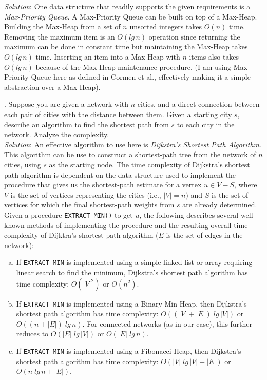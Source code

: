 \documentclass{scrartcl}
\begin{document}
    \noindent
    \textit{Solution}: One data structure that readily supports the given requirements is a
    \emph{Max-Priority Queue}. A Max-Priority Queue can be built on top of a Max-Heap. Building the
    Max-Heap from a set of $n$ unsorted integers takes $O(n)$ time. Removing the maximum item is an
    $O(lg\,n)$ operation since returning the maximum can be done in constant time but maintaining
    the Max-Heap takes $O(lg\,n)$ time. Inserting an item into a Max-Heap with $n$ items also takes
    $O(lg\,n)$ because of the Max-Heap maintenance procedure. (I am using Max-Priority Queue here as
    defined in Cormen et al., effectively making it a simple abstraction over a Max-Heap).

    \newpage
    . Suppose you are given a network with $n$ cities, and a direct connection between each pair of
    cities with the distance between them. Given a starting city $s$, describe an algorithm to find
    the shortest path from $s$ to each city in the network. Analyze the complexity.\\

    \noindent
    \textit{Solution}: An effective algorithm to use here is \emph{Dijkstra's Shortest Path
    Algorithm}. This algorithm can be use to construct a shortest-path tree from the network of $n$
    cities, using $s$ as the starting node. The time complexity of Dijkstra's shortest path
    algorithm is dependent on the data structure used to implement the procedure that gives us the
    shortest-path estimate for a vertex $u \in V - S$, where $V$ is the set of vertices representing
    the cities (i.e., $|V| = n$) and $S$ is the set of vertices for which the final shortest-path
    weights from $s$ are already determined. Given a procedure \verb|EXTRACT-MIN()| to get $u$, the
    following describes several well known methods of implementing the procedure and the resulting
    overall time complexity of Dijktra's shortest path algorithm ($E$ is the set of edges in the
    network):
    \begin{enumerate}[(a)]
        \item If \verb|EXTRACT-MIN| is implemented using a simple linked-list or array requiring
            linear search to find the minimum, Dijkstra's shortest path algorithm has time
            complexity: $O(|V|^2)$ or $O(n^2)$.
        \item If \verb|EXTRACT-MIN| is implemented using a Binary-Min Heap, then Dijkstra's shortest
            path algorithm has time complexity: $O((|V| + |E|)\;lg\,|V|)$ or $O((n + |E|)\;lg\,n)$.
            For connected networks (as in our case), this further reduces to $O(|E|\;lg\,|V|)$ or
            $O(|E|\;lg\,n)$.
        \item If \verb|EXTRACT-MIN| is implemented using a Fibonacci Heap, then Dijkstra's shortest
            path algorithm has time complexity: $O(|V|\;lg\,|V| + |E|)$ or $O(n\;lg\,n + |E|)$.
    \end{enumerate}
\end{document}
